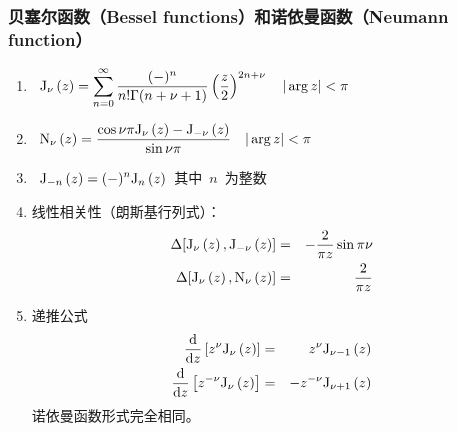 \documentclass[12pt,a4paper]{article}
\newcommand\dif{\mathrm{d}}
\renewcommand{\[}{\ $\displaystyle}
\renewcommand{\]}{$\ }%
\newcommand{\fdif}[2]{\ensuremath{\frac{\dif #1}{\dif #2}}}
\newcommand{\summ}[2][n]{\sum_{#1=#2}^\infty}
\begin{document}
	  \subsubsection{贝塞尔函数（Bessel functions）和诺依曼函数（Neumann function）}
	   \begin{enumerate}
	     \item \[
	     	  \fj{z} =\summ{0} \frac{(-)^n}{n! \Gamma(n + \nu + 1)}\left(\frac z2\right)^{2n+\nu} \quad |\arg z|<\pi
	     	\]
	     \item \[
	     	  \fn{z} = \frac{\cos \nu\pi \fj{z} - \fj[-\nu]{z}}{\sin \nu\pi} \quad |\arg z|<\pi
	     	\]
	     \item \[\fj[-n]{z} = (-)^n\fj[n]{z}\]其中\[n\]为整数
	     \item 线性相关性（朗斯基行列式）：
	     	\begin{eqnarray*}
	     	 \Delta[\fj{z},\fj[-\nu]{z}] &=& -\frac{2}{\pi z}\sin \pi\nu \\
	     	 \Delta[\fj{z},\fn{z}] &=& \frac{2}{\pi z}
	     	\end{eqnarray*}
	     \item 递推公式
	     	\begin{eqnarray*}
	     	 \fdif{}{z}\left[z^\nu\fj[\nu]{z}\right] &=& z^\nu\fj[\nu -1]{z} \\
	     	 \fdif{}{z}\left[z^{-\nu}\fj[\nu]{z}\right] &=& -z^{-\nu}\fj[\nu +1]{z} 
	     	\end{eqnarray*}
	     	诺依曼函数形式完全相同。

\end{enumerate}
\end{document}
